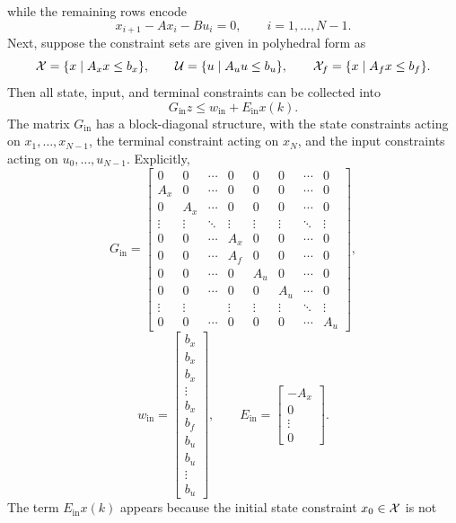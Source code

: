 while the remaining rows encode
\[
x_{i+1}-Ax_i-Bu_i=0,\qquad i=1,\dots,N-1.
\]
Next, suppose the constraint sets are given in polyhedral form as
\[
\mathcal{X}=\{x\mid A_xx\le b_x\},\qquad
\mathcal{U}=\{u\mid A_uu\le b_u\},\qquad
\mathcal{X}_f=\{x\mid A_fx\le b_f\}.
\]
Then all state, input, and terminal constraints can be collected into
\[
G_{\mathrm{in}} z \le w_{\mathrm{in}} + E_{\mathrm{in}}x(k).
\]
The matrix \(G_{\mathrm{in}}\) has a block-diagonal structure, with the state constraints acting
on \(x_1,\dots,x_{N-1}\), the terminal constraint acting on \(x_N\), and the input constraints
acting on \(u_0,\dots,u_{N-1}\). Explicitly,
\[
G_{\mathrm{in}}=
\begin{bmatrix}
0 & 0 & \cdots & 0 & 0 & 0 & \cdots & 0\\
A_x & 0   & \cdots & 0   & 0   & 0   & \cdots & 0\\
0   & A_x & \cdots & 0   & 0   & 0   & \cdots & 0\\
\vdots & \vdots & \ddots & \vdots & \vdots & \vdots & \ddots & \vdots\\
0   & 0   & \cdots & A_x & 0   & 0   & \cdots & 0\\
0   & 0   & \cdots & A_f & 0   & 0   & \cdots & 0\\[0.3em]
0   & 0   & \cdots & 0   & A_u & 0   & \cdots & 0\\
0   & 0   & \cdots & 0   & 0   & A_u & \cdots & 0\\
\vdots & \vdots &  & \vdots & \vdots & \vdots & \ddots & \vdots\\
0   & 0   & \cdots & 0   & 0   & 0   & \cdots & A_u
\end{bmatrix},
\]
\[
w_{\mathrm{in}}=
\begin{bmatrix}
b_x \\
b_x\\
b_x\\
\vdots\\
b_x\\
b_f\\
b_u\\
b_u\\
\vdots\\
b_u
\end{bmatrix},
\qquad
E_{\mathrm{in}}=
\begin{bmatrix}
-A_x\\
0\\
\vdots\\
0
\end{bmatrix}.
\]
The term \(E_{\mathrm{in}}x(k)\) appears because the initial state constraint \(x_0\in\mathcal{X}\) is not
